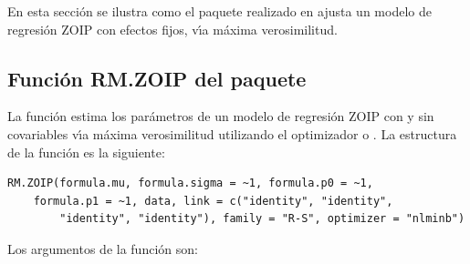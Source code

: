 En esta secci\'{o}n se ilustra como el paquete  realizado en  ajusta un modelo de regresi\'{o}n ZOIP con efectos fijos, v\'{\i}a m\'{a}xima verosimilitud.

%
%

\subsection{Funci\'{o}n RM.ZOIP del paquete }

La funci\'{o}n  estima los par\'{a}metros de un modelo de regresi\'{o}n ZOIP con y sin covariables v\'{\i}a m\'{a}xima verosimilitud utilizando el optimizador  o . La estructura de la funci\'{o}n  es la siguiente:

\begin{verbatim}
RM.ZOIP(formula.mu, formula.sigma = ~1, formula.p0 = ~1, 
    formula.p1 = ~1, data, link = c("identity", "identity", 
        "identity", "identity"), family = "R-S", optimizer = "nlminb")
\end{verbatim}

Los argumentos de la funci\'{o}n  son:

